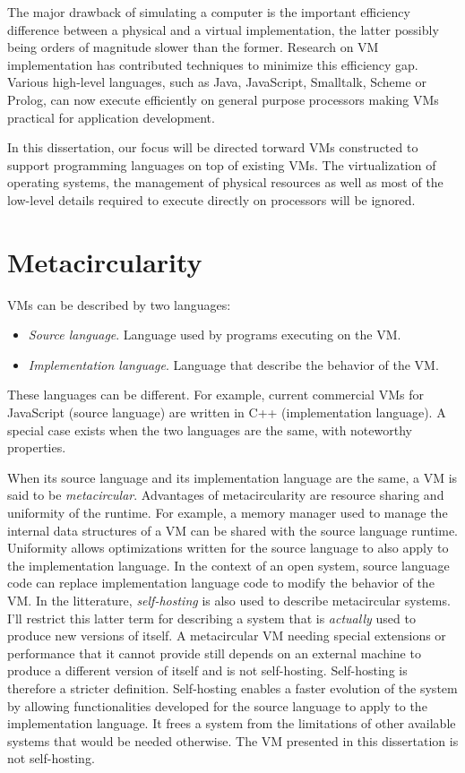 The major drawback of simulating a computer is the important efficiency
difference between a physical and a virtual implementation, the latter possibly
being orders of magnitude slower than the former. Research on VM
implementation has contributed techniques to minimize this efficiency gap.
Various high-level languages, such as Java, JavaScript, Smalltalk, Scheme or
Prolog, can now execute efficiently on general purpose processors making VMs
practical for application development.

In this dissertation, our focus will be directed torward VMs constructed to
support programming languages on top of existing VMs. The virtualization of
operating systems, the management of physical resources as well as most of the
low-level details required to execute directly on processors will be ignored.

\section{Metacircularity}

VMs can be described by two languages:
\begin{itemize}
    \item \textit{Source language}. Language used by programs executing on the
        VM.
    \item \textit{Implementation language}. Language that describe the behavior
        of the VM.
\end{itemize}
These languages can be different. For example, current commercial VMs for
JavaScript (source language) are written in C++ (implementation language).  A
special case exists when the two languages are the same, with noteworthy
properties.

When its source language and its implementation language are the same, a VM is
said to be \textit{metacircular}. Advantages of metacircularity are resource
sharing and uniformity of the runtime. For example, a memory manager used to
manage the internal data structures of a VM can be shared with the source
language runtime. Uniformity allows optimizations written for the source
language to also apply to the implementation language. In the context of an
open system, source language code can replace implementation language code to
modify the behavior of the VM. In the litterature, \textit{self-hosting} is
also used to describe metacircular systems. I'll restrict this latter term for
describing a system that is \textit{actually} used to produce new versions of
itself.  A metacircular VM needing special extensions or performance that it
cannot provide still depends on an external machine to produce a different
version of itself and is not self-hosting.  Self-hosting is therefore a
stricter definition.  Self-hosting enables a faster evolution of the system by
allowing functionalities developed for the source language to apply to the
implementation language. It frees a system from the limitations of other
available systems that would be needed otherwise. The VM presented in this
dissertation is not self-hosting.

